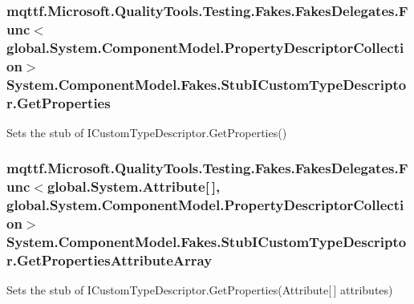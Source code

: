 \hypertarget{class_system_1_1_component_model_1_1_fakes_1_1_stub_i_custom_type_descriptor_abf769957183547cd50457f59e29e7d40}{
\subsubsection[{Get\-Properties}]{\setlength{\rightskip}{0pt plus 5cm}mqttf.\-Microsoft.\-Quality\-Tools.\-Testing.\-Fakes.\-Fakes\-Delegates.\-Func$<$global.\-System.\-Component\-Model.\-Property\-Descriptor\-Collection$>$ System.\-Component\-Model.\-Fakes.\-Stub\-I\-Custom\-Type\-Descriptor.\-Get\-Properties}}\label{class_system_1_1_component_model_1_1_fakes_1_1_stub_i_custom_type_descriptor_abf769957183547cd50457f59e29e7d40}


Sets the stub of I\-Custom\-Type\-Descriptor.\-Get\-Properties()

\hypertarget{class_system_1_1_component_model_1_1_fakes_1_1_stub_i_custom_type_descriptor_acf25b87792cbf18900d50ddbf358f045}{
\subsubsection[{Get\-Properties\-Attribute\-Array}]{\setlength{\rightskip}{0pt plus 5cm}mqttf.\-Microsoft.\-Quality\-Tools.\-Testing.\-Fakes.\-Fakes\-Delegates.\-Func$<$global.\-System.\-Attribute\mbox{[}$\,$\mbox{]}, global.\-System.\-Component\-Model.\-Property\-Descriptor\-Collection$>$ System.\-Component\-Model.\-Fakes.\-Stub\-I\-Custom\-Type\-Descriptor.\-Get\-Properties\-Attribute\-Array}}\label{class_system_1_1_component_model_1_1_fakes_1_1_stub_i_custom_type_descriptor_acf25b87792cbf18900d50ddbf358f045}


Sets the stub of I\-Custom\-Type\-Descriptor.\-Get\-Properties(\-Attribute\mbox{[}$\,$\mbox{]} attributes)

